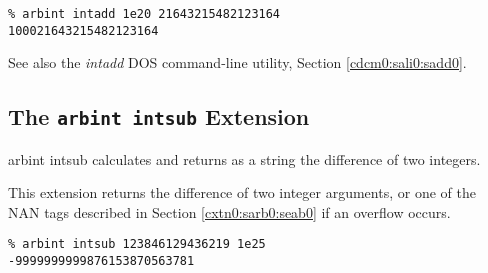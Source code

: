 \begin{tclcommandsampleinvocations}
\begin{scriptsize}
\begin{verbatim}
% arbint intadd 1e20 21643215482123164
100021643215482123164
\end{verbatim}
\end{scriptsize}
\end{tclcommandsampleinvocations}

\begin{tclcommandseealso}
See also the \emph{intadd} DOS command-line utility, 
Section \ref{cdcm0:sali0:sadd0}.
\end{tclcommandseealso}

\subsection{The \texttt{arbint intsub} Extension}
\label{cxtn0:sarb0:ssub0}

\begin{tclcommandname}{arbint intsub}%
calculates and returns as a string the difference of two integers.
\end{tclcommandname}

\begin{tclcommandsynopsis}
\end{tclcommandsynopsis}

\begin{tclcommanddescription}
This extension returns the difference of two integer
arguments, or one of the NAN tags described in
Section \ref{cxtn0:sarb0:seab0} if an overflow occurs.
\end{tclcommanddescription}

\begin{tclcommandsampleinvocations}
\begin{scriptsize}
\begin{verbatim}
% arbint intsub 123846129436219 1e25
-9999999999876153870563781
\end{verbatim}
\end{scriptsize}
\end{tclcommandsampleinvocations}

